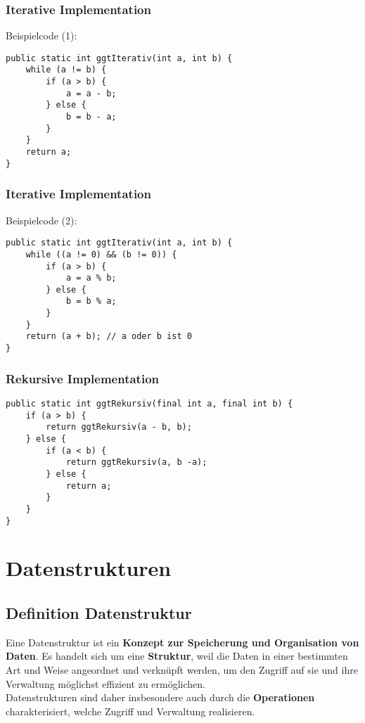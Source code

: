 \subsubsection{Iterative Implementation}
Beispielcode (1):\\
\lstset{language=Java}
\begin{lstlisting}
public static int ggtIterativ(int a, int b) {
    while (a != b) {
        if (a > b) {
            a = a - b;
        } else {
            b = b - a;
        }
    }
    return a;
}
\end{lstlisting}

\subsubsection{Iterative Implementation}
Beispielcode (2):\\
\lstset{language=Java}
\begin{lstlisting}
public static int ggtIterativ(int a, int b) {
    while ((a != 0) && (b != 0)) {
        if (a > b) {
            a = a % b;
        } else {
            b = b % a;
        }
    }
    return (a + b); // a oder b ist 0
}
\end{lstlisting}

\subsubsection{Rekursive Implementation}
\lstset{language=Java}
\begin{lstlisting}
public static int ggtRekursiv(final int a, final int b) {
    if (a > b) {
        return ggtRekursiv(a - b, b);
    } else {
        if (a < b) {
            return ggtRekursiv(a, b -a);
        } else {
            return a;
        }
    }
}
\end{lstlisting}

\section{Datenstrukturen}
\subsection{Definition Datenstruktur}
Eine Datenstruktur ist ein \textbf{Konzept zur Speicherung und Organisation von Daten}. Es handelt sich um eine \textbf{Struktur}, weil die Daten in einer bestimmten Art und Weise angeordnet und verknüpft werden, um den Zugriff auf sie und ihre Verwaltung möglichst effizient zu ermöglichen.\\
Datenstrukturen sind daher insbesondere auch durch die \textbf{Operationen} charakterisiert, welche Zugriff und Verwaltung realisieren.
